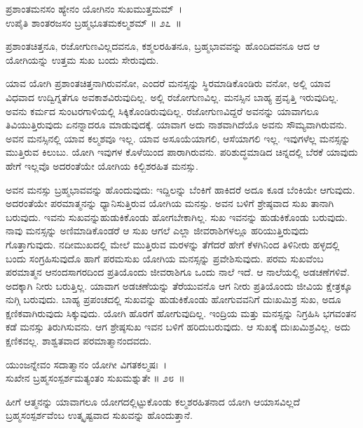 \begin{shloka}
ಪ್ರಶಾಂತಮನಸಂ ಹ್ಯೇನಂ ಯೋಗಿನಂ ಸುಖಮುತ್ತಮಮ್~।\\ಉಪೈತಿ ಶಾಂತರಜಸಂ ಬ್ರಹ್ಮಭೂತಮಕಲ್ಮಶಮ್ \hfill॥ ೨೭~॥
\end{shloka}

\begin{artha}
ಪ್ರಶಾಂತಚಿತ್ತನೂ, ರಜೋಗುಣವಿಲ್ಲದವನೂ, ಕಶ್ಮಲರಹಿತನೂ, ಬ್ರಹ್ಮಭಾವವನ್ನು ಹೊಂದಿದವನೂ ಆದ ಆ ಯೋಗಿಯನ್ನು ಉತ್ತಮ ಸುಖ ಬಂದು ಸೇರುವುದು.
\end{artha}

ಯಾವ ಯೋಗಿ ಪ್ರಶಾಂತಚಿತ್ತನಾಗಿರುವನೋ, ಎಂದರೆ ಮನಸ್ಸನ್ನು ಸ್ಥಿರಮಾಡಿಕೊಂಡಿರು ವನೋ, ಅಲ್ಲಿ ಯಾವ ವಿಧವಾದ ಉದ್ವಿಗ್ನತೆಗೂ ಅವಕಾಶವಿರುವುದಿಲ್ಲ. ಅಲ್ಲಿ ರಜೋಗುಣವಿಲ್ಲ. ಮನಸ್ಸಿನ ಬಾಹ್ಯ ಪ್ರವೃತ್ತಿ ಇರುವುದಿಲ್ಲ. ಅವನು ಕರ್ಮದ ಸುಂಟರಗಾಳಿಯಲ್ಲಿ ಸಿಕ್ಕಿಕೊಂಡಿರುವುದಿಲ್ಲ. ರಜೋಗುಣವಿದ್ದರೆ ಅವನನ್ನು ಯಾವಾಗಲೂ ತಿವಿಯುತ್ತಿರುವುದು ಏನನ್ನಾದರೂ ಮಾಡುವುದಕ್ಕೆ. ಯಾವಾಗ ಅದು ನಾಶವಾಗಿದೆಯೊ ಅವನು ಸೌಮ್ಯವಾಗಿರುವನು. ಅವನ ಮನಸ್ಸಿನಲ್ಲಿ ಯಾವ ಕಲ್ಮಶವೂ ಇಲ್ಲ. ಯಾವ ಅಸೂಯೆಯಾಗಲಿ, ಆಸೆಯಾಗಲಿ ಇಲ್ಲ. ಇವುಗಳೆಲ್ಲ ಮನಸ್ಸನ್ನು ಮುತ್ತಿರುವ ಕಿಲುಬು. ಯೋಗಿ ಇವುಗಳ ಕೊಳೆಯಿಂದ ಪಾರಾಗಿರುವನು. ಪರಿಶುದ್ಧಮಾಡಿದ ಚಿನ್ನದಲ್ಲಿ ಬೆರಕೆ ಯಾವುದು ಹೇಗೆ ಇಲ್ಲವೊ ಅದರಂತೆಯೇ ಯೋಗಿಯ ಕಿಲ್ಬಿಶರಹಿತ ಮನಸ್ಸು.

ಅವನ ಮನಸ್ಸು ಬ್ರಹ್ಮಭಾವವನ್ನು ಹೊಂದುವುದು: ಇದ್ದಿಲನ್ನು ಬೆಂಕಿಗೆ ಹಾಕಿದರೆ ಅದೂ ಕೂಡ ಬೆಂಕಿಯೇ ಆಗುವುದು. ಅದರಂತೆಯೇ ಪರಮಾತ್ಮನನ್ನು ಧ್ಯಾನಿಸುತ್ತಿರುವ ಯೋಗಿಯ ಮನಸ್ಸು. ಅವನ ಬಳಿಗೆ ಶ್ರೇಷ್ಠವಾದ ಸುಖ ತಾನಾಗಿ ಬರುವುದು. ಇವನು ಸುಖವನ್ನು\break ಹುಡುಕಿಕೊಂಡು ಹೋಗಬೇಕಾಗಿಲ್ಲ. ಸುಖ ಇವನನ್ನು ಹುಡುಕಿಕೊಂಡು ಬರುವುದು. ನಾವು ಮನಸ್ಸನ್ನು ಅಣಿಮಾಡಿಕೊಂಡರೆ ಆ ಸುಖ ಆಗಲೆ ಎಲ್ಲಾ ಜೀವರಾಶಿಗಳಲ್ಲೂ ಹರಿಯುತ್ತಿರುವುದು ಗೊತ್ತಾಗುವುದು. ನದೀಮುಖದಲ್ಲಿ ಮೇಲೆ ಮುತ್ತಿರುವ ಮರಳನ್ನು ತೆಗೆದರೆ ಹೇಗೆ ಕೆಳಗಿನಿಂದ ತಿಳಿನೀರು ಹಳ್ಳದಲ್ಲಿ ಬಂದು ಸಂಗ್ರಹಿಸುವುದೊ ಹಾಗೆ ಪರಮಸುಖ ಯೋಗಿಯ ಮನಸ್ಸನ್ನು ಪ್ರವೇಶಿಸುವುದು. ಪರಮ ಸುಖವೆಂಬ ಪರಮಾತ್ಮನ ಆನಂದಸಾಗರದಿಂದ ಪ್ರತಿಯೊಂದು ಜೀವರಾಶಿಗೂ ಒಂದು ನಾಲೆ ಇದೆ. ಆ ನಾಲೆಯಲ್ಲಿ ಅಡಚಣೆಗಳಿವೆ. ಅದಕ್ಕಾಗಿ ನೀರು ಬರುತ್ತಿಲ್ಲ. ಯಾವಾಗ ಅಡಚಣೆಯನ್ನು ತೆರೆಯುವನೊ ಆಗ ನೀರು ಪ್ರತಿಯೊಂದು ಜೀವಿಯ ಕ್ಷೇತ್ರಕ್ಕೂ ನುಗ್ಗಿ ಬರುವುದು. ಬಾಹ್ಯ ಪ್ರಪಂಚದಲ್ಲಿ ಸುಖವನ್ನು ಹುಡುಕಿಕೊಂಡು ಹೋಗುವವನಿಗೆ ದುಃಖಮಿಶ್ರ ಸುಖ, ಅದೂ ಕ್ಷಣಿಕವಾಗಿರುವುದು ಸಿಕ್ಕುವುದು. ಯೋಗಿ ಹೊರಗೆ ಹೋಗುವುದಿಲ್ಲ. ಇಂದ್ರಿಯ ಮತ್ತು ಮನಸ್ಸನ್ನು ನಿಗ್ರಹಿಸಿ ಭಗವಂತನ ಕಡೆ ಮನಸ್ಸು ತಿರುಗಿಸುವನು. ಆಗ ಶ್ರೇಷ್ಠಸುಖ ಇವನ ಬಳಿಗೆ ಹರಿದುಬರುವುದು. ಆ ಸುಖಕ್ಕೆ ದುಃಖಮಿಶ್ರವಿಲ್ಲ. ಅದು ಕ್ಷಣಿಕವಲ್ಲ. ಶಾಶ್ವತವಾದ ಪರಮಾತ್ಮಾನಂದವದು.

\begin{shloka}
ಯುಂಜನ್ನೇವಂ ಸದಾತ್ಮಾನಂ ಯೋಗೀ ವಿಗತಕಲ್ಮಷಃ~।\\ಸುಖೇನ ಬ್ರಹ್ಮಸಂಸ್ಪರ್ಶಮತ್ಯಂತಂ ಸುಖಮಶ್ನುತೇ \hfill॥ ೨೮~॥
\end{shloka}

\begin{artha}
ಹೀಗೆ ಆತ್ಮನನ್ನು ಯಾವಾಗಲೂ ಯೋಗದಲ್ಲಿಟ್ಟುಕೊಂಡು ಕಲ್ಮಶರಹಿತನಾದ ಯೋಗಿ ಆಯಾಸವಿಲ್ಲದೆ ಬ್ರಹ್ಮಸಂಸ್ಪರ್ಶವೆಂಬ ಉತ್ಕೃಷ್ಟವಾದ ಸುಖವನ್ನು ಹೊಂದುತ್ತಾನೆ.
\end{artha}

